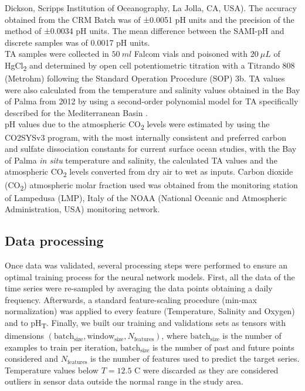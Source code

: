 Dickson, Scripps  Institution  of  Oceanography, La  Jolla,  CA,  USA). The
accuracy obtained from the CRM Batch was of ±0.0051 pH units and the precision
of the method  of ±0.0034 pH units. The mean difference between the SAMI-pH and
discrete samples was of 0.0017 pH units.\\
TA samples were collected in $\SI{50}{ml}$ Falcom vials and poisoned with
$\SI{20}{\mu L}$ of HgCl\textsubscript{2} and determined by open cell
potentiometric titration with a Titrando 808 (Metrohm) following the Standard
Operation Procedure (SOP) 3b\cite{Dickson2007}.
TA values were also calculated from the temperature and salinity values
obtained in the Bay of Palma from 2012 by using a second-order polynomial model
for TA specifically described for the Mediterranean Basin \cite{Gemayel2015}.
\\
pH values due to the atmospheric CO\textsubscript{2} levels were estimated
by using the CO2SYSv3 program\cite{Sharp2020}, with the most internally
consistent and preferred carbon \cite{mehrbach1973,dickson1987} and sulfate
dissociation constants\cite{dickson1990} for current surface ocean
studies\cite{woosley2021}, with the Bay of Palma \emph{in situ} temperature and
salinity, the calculated TA values and the atmospheric CO\textsubscript{2}
levels converted from dry air to wet\cite{weiss1980nitrous} as inputs. Carbon
dioxide (CO\textsubscript{2}) atmospheric molar fraction used was obtained from
the monitoring station of Lampedusa (LMP), Italy of the NOAA (National Oceanic
and Atmospheric Administration, USA) monitoring network\cite{Duglokencky2021}.

\subsection{Data processing}

Once data was validated, several processing steps were performed to ensure
an optimal training process for the neural network models. First, all the data
of the time series were re-sampled by averaging the data points obtaining a
daily frequency. Afterwards, a standard feature-scaling procedure (min-max
normalization) was applied to every feature (Temperature, Salinity and Oxygen)
and to pH\textsubscript{T}. Finally, we built our training and validations sets
as tensors with dimensions $(\textrm{batch}_\textrm{size},
    \textrm{window}_\textrm{size}, N_{\textrm{features}})$,  where
$\textrm{batch}_\textrm{size}$ is the number of examples to train per
iteration, $\textrm{batch}_\textrm{size}$ is the number of past and future
points considered and $N_{\textrm{features}}$ is the number of features used to
predict the target series. Temperature values below $T=12.5$ \textdegree C were
discarded as they are considered outliers in sensor data outside the normal
range in the study area.

